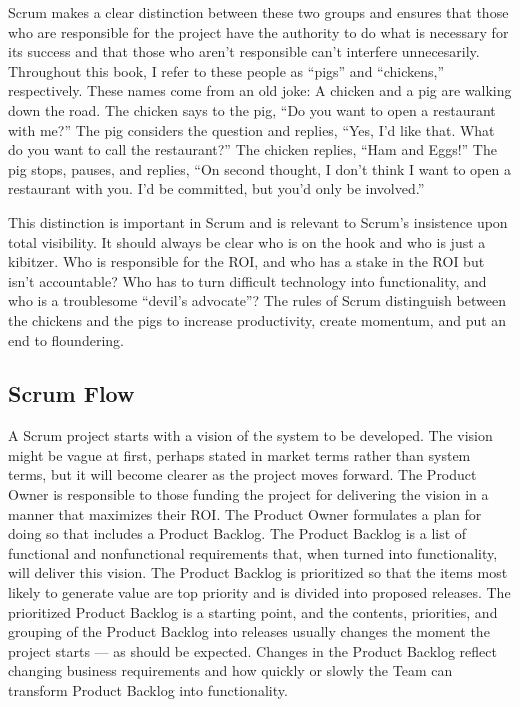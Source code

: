 Scrum makes a clear distinction between these two groups and ensures that those who are responsible for the project have the authority to do what is necessary for its success and that those who aren’t responsible can’t interfere unnecesarily. Throughout this book, I refer to these people as “pigs” and “chickens,” respectively. These names come from an old joke: A chicken and a pig are walking down the road. The chicken says to the pig, “Do you want to open a restaurant with me?” The pig considers the question and replies, “Yes, I’d like that. What do you want to call the restaurant?” The chicken replies, “Ham and Eggs!” The pig stops, pauses, and replies, “On second thought, I don’t think I want to open a restaurant with you. I’d be committed, but you’d only be involved.”

This distinction is important in Scrum and is relevant to Scrum’s insistence upon total visibility. It should always be clear who is on the hook and who is just a kibitzer. Who is responsible for the ROI, and who has a stake in the ROI but isn’t accountable? Who has to turn difficult technology into functionality, and who is a troublesome “devil’s advocate”? The rules of Scrum distinguish between the chickens and the pigs to increase productivity, create momentum, and put an end to floundering.


\subsection{Scrum Flow}

A Scrum project starts with a vision of the system to be developed. The vision might be vague at first, perhaps stated in market terms rather than system terms, but it will become clearer as the project moves forward. The Product Owner is responsible to those funding the project for delivering the vision in a manner that maximizes their ROI. The Product Owner formulates a plan for doing so that includes a Product Backlog. The Product Backlog is a list of functional and nonfunctional requirements that, when turned into functionality, will deliver this vision. The Product Backlog is prioritized so that the items most likely to generate value are top priority and is divided into proposed releases. The prioritized Product Backlog is a starting point, and the contents, priorities, and grouping of the Product Backlog into releases usually changes the moment the project starts — as should be expected. Changes in the Product Backlog reflect changing business requirements and how quickly or slowly the Team can transform Product Backlog into functionality.


